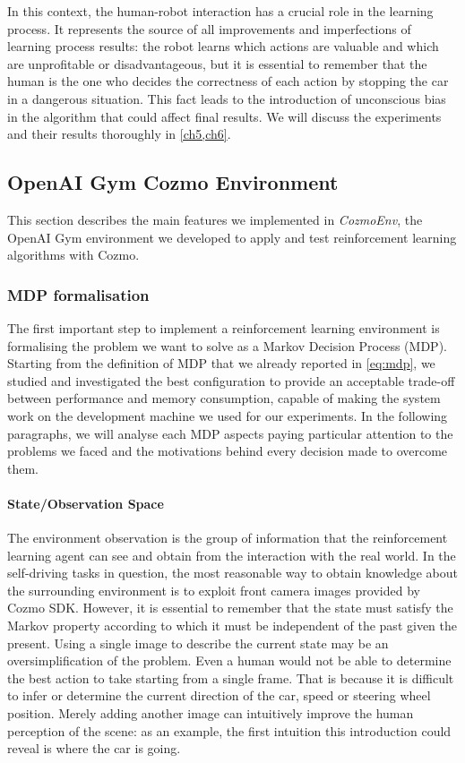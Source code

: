 In this context, the human-robot interaction has a crucial role in the learning process. It represents the source of all improvements and imperfections of learning process results: the robot learns which actions are valuable and which are unprofitable or disadvantageous, but it is essential to remember that the human is the one who decides the correctness of each action by stopping the car in a dangerous situation. This fact leads to the introduction of unconscious bias in the algorithm that could affect final results. We will discuss the experiments and their results thoroughly in \vref{ch5,ch6}.

\subsection{OpenAI Gym Cozmo Environment}

This section describes the main features we implemented in \textit{CozmoEnv}, the OpenAI Gym environment we developed to apply and test reinforcement learning algorithms with Cozmo. 

\subsubsection{MDP formalisation}

The first important step to implement a reinforcement learning environment is formalising the problem we want to solve as a Markov Decision Process (MDP). Starting from the definition of MDP that we already reported in \vref{eq:mdp}, we studied and investigated the best configuration to provide an acceptable trade-off between performance and memory consumption, capable of making the system work on the development machine we used for our experiments. In the following paragraphs, we will analyse each MDP aspects paying particular attention to the problems we faced and the motivations behind every decision made to overcome them.

\paragraph{State/Observation Space} The environment observation is the group of information that the reinforcement learning agent can see and obtain from the interaction with the real world. In the self-driving tasks in question, the most reasonable way to obtain knowledge about the surrounding environment is to exploit front camera images provided by Cozmo SDK. However, it is essential to remember that the state must satisfy the Markov property according to which it must be independent of the past given the present. Using a single image to describe the current state may be an oversimplification of the problem. Even a human would not be able to determine the best action to take starting from a single frame. That is because it is difficult to infer or determine the current direction of the car, speed or steering wheel position. Merely adding another image can intuitively improve the human perception of the scene: as an example, the first intuition this introduction could reveal is where the car is going.

